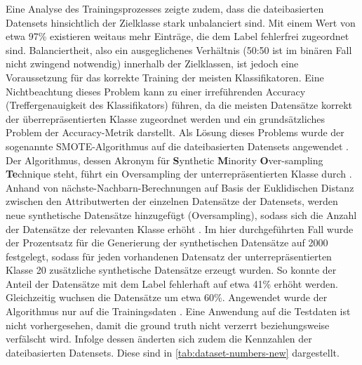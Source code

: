 \label{smote}
Eine Analyse des Trainingsprozesses zeigte zudem, dass die dateibasierten Datensets hinsichtlich der Zielklasse stark unbalanciert sind. Mit einem Wert von etwa 97\% existieren weitaus mehr Einträge, die dem Label \glqq fehlerfrei\grqq{} zugeordnet sind. Balanciertheit, also ein ausgeglichenes Verhältnis (50:50 ist im binären Fall nicht zwingend notwendig) innerhalb der Zielklassen, ist jedoch eine Voraussetzung für das korrekte Training der meisten Klassifikatoren. Eine Nichtbeachtung dieses Problem kann zu einer irreführenden Accuracy (Treffergenauigkeit des Klassifikators) führen, da die meisten Datensätze korrekt der überrepräsentierten Klasse zugeordnet werden und ein grundsätzliches Problem der Accuracy-Metrik darstellt. Als Lösung dieses Problems wurde der sogenannte SMOTE-Algorithmus auf die dateibasierten Datensets angewendet \cite{Chawla2002}. Der Algorithmus, dessen Akronym für \textbf{S}ynthetic \textbf{M}inority \textbf{O}ver-sampling \textbf{Te}chnique steht, führt ein Oversampling der unterrepräsentierten Klasse durch \cite{Chawla2002}. Anhand von nächste-Nachbarn-Berechnungen auf Basis der Euklidischen Distanz zwischen den Attributwerten der einzelnen Datensätze der Datensets, werden neue synthetische Datensätze hinzugefügt (Oversampling), sodass sich die Anzahl der Datensätze der relevanten Klasse erhöht \cite{Chawla2002}. Im hier durchgeführten Fall wurde der Prozentsatz für die Generierung der synthetischen Datensätze auf 2000 festgelegt, sodass für jeden vorhandenen Datensatz der unterrepräsentierten Klasse 20 zusätzliche synthetische Datensätze erzeugt wurden. So konnte der Anteil der Datensätze mit dem Label \glqq fehlerhaft\grqq{} auf etwa 41\% erhöht werden. Gleichzeitig wuchsen die Datensätze um etwa 60\%. Angewendet wurde der Algorithmus nur auf die Trainingsdaten \cite{Chawla2002} . Eine Anwendung auf die Testdaten ist nicht vorhergesehen, damit die \glqq ground truth\grqq{} nicht verzerrt beziehungsweise verfälscht wird. Infolge dessen änderten sich zudem die Kennzahlen der dateibasierten Datensets. Diese sind in \autoref{tab:dataset-numbers-new} dargestellt.

